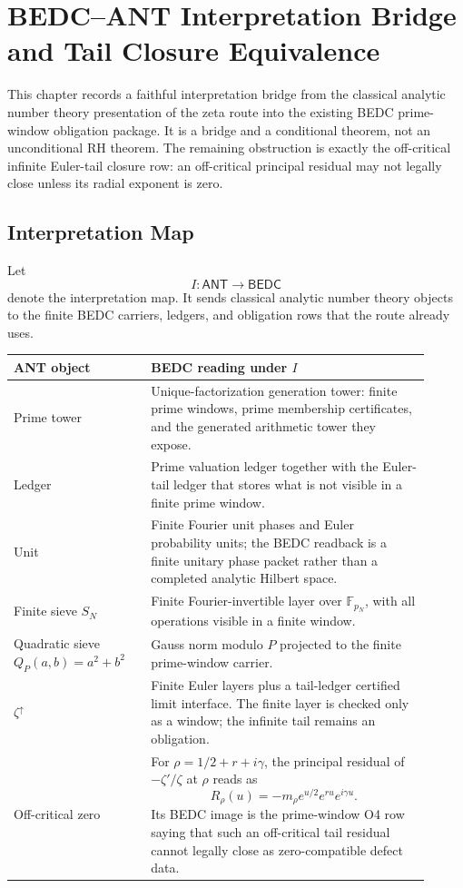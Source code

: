 \chapter{BEDC--ANT Interpretation Bridge and Tail Closure Equivalence}
\label{ch:visions-rh-bedc-ant-bridge}

This chapter records a faithful interpretation bridge from the classical
analytic number theory presentation of the zeta route into the existing BEDC
prime-window obligation package. It is a bridge and a conditional theorem, not
an unconditional RH theorem. The remaining obstruction is exactly the
off-critical infinite Euler-tail closure row: an off-critical principal
residual may not legally close unless its radial exponent is zero.

\section{Interpretation Map}
\label{sec:rh-bedc-ant-interpretation-map}

Let
$$
I:\mathsf{ANT}\longrightarrow\mathsf{BEDC}
$$
denote the interpretation map. It sends classical analytic number theory
objects to the finite BEDC carriers, ledgers, and obligation rows that the
route already uses.

\begin{center}
\begin{tabular}{p{0.30\linewidth}p{0.61\linewidth}}
\toprule
\textbf{ANT object} & \textbf{BEDC reading under $I$}\\
\midrule
Prime tower &
Unique-factorization generation tower: finite prime windows, prime membership
certificates, and the generated arithmetic tower they expose.\\
\addlinespace
Ledger &
Prime valuation ledger together with the Euler-tail ledger that stores what is
not visible in a finite prime window.\\
\addlinespace
Unit &
Finite Fourier unit phases and Euler probability units; the BEDC readback is a
finite unitary phase packet rather than a completed analytic Hilbert space.\\
\addlinespace
Finite sieve $S_N$ &
Finite Fourier-invertible layer over $\mathbb F_{p_N}$, with all operations
visible in a finite window.\\
\addlinespace
Quadratic sieve $Q_P(a,b)=a^2+b^2$ &
Gauss norm modulo $P$ projected to the finite prime-window carrier.\\
\addlinespace
$\zeta^{\uparrow}$ &
Finite Euler layers plus a tail-ledger certified limit interface. The finite
layer is checked only as a window; the infinite tail remains an obligation.\\
\addlinespace
Off-critical zero &
For $\rho=1/2+r+i\gamma$, the principal residual of $-\zeta'/\zeta$ at
$\rho$ reads as
$$
R_{\rho}(u)=-m_{\rho}e^{u/2}e^{ru}e^{i\gamma u}.
$$
Its BEDC image is the prime-window O4 row saying that such an off-critical
tail residual cannot legally close as zero-compatible defect data.\\
\bottomrule
\end{tabular}
\end{center}

